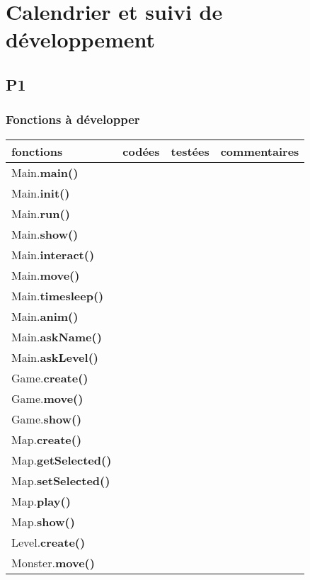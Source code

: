 \documentclass[a4paper]{article}
\begin{document}
    \section{Calendrier et suivi de développement}
        \subsection{P1}
            \subsubsection{Fonctions à développer}
            \begin{tabular}{|l|c|c|c|}
      \hline
      fonctions & codées & testées & commentaires \\
      \hline
      Main.\textbf{main()} & & & \\
      \hline
      Main.\textbf{init()} & & & \\
      \hline
      Main.\textbf{run()}  & & & \\
      \hline
      Main.\textbf{show()} & & & \\
      \hline
      Main.\textbf{interact()} & & & \\
      \hline
      Main.\textbf{move()} & & & \\
      \hline
      Main.\textbf{timesleep()} & & & \\
      \hline
      Main.\textbf{anim()} & & & \\
      \hline 
      Main.\textbf{askName()} & & & \\
      \hline
      Main.\textbf{askLevel()} & & & \\
      \hline
      \hline
      Game.\textbf{create()} & & & \\
      \hline
      Game.\textbf{move()} & & & \\
      \hline
      Game.\textbf{show()} & & & \\
      \hline 
      \hline
      Map.\textbf{create()} & & & \\
      \hline
      Map.\textbf{getSelected()} & & & \\
      \hline
      Map.\textbf{setSelected()} & & & \\
      \hline
      Map.\textbf{play()} & & & \\
      \hline
      Map.\textbf{show()} & & & \\
      \hline
      \hline
      Level.\textbf{create()} & & & \\
      \hline
      \hline
      Monster.\textbf{move()} & & & \\

\end{tabular}
\end{document}
